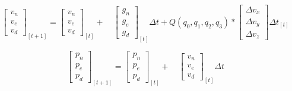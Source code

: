 \begin{equation}
        \left[\begin{array}{c}
            v_n  \\
            v_e  \\
            v_d
        \end{array}\right]_{[t+1]}=\left[\begin{array}{c}
            v_n  \\
            v_e  \\
            v_d
        \end{array}\right]_{[t]}+\quad\left[\begin{array}{c}
            g_n  \\
            g_e  \\
            g_d
        \end{array}\right]_{[t]}{\Delta t}+Q(q_0,q_1,q_2,q_3)*\left[\begin{array}{c}
            \Delta v_x  \\
            \Delta v_y  \\
            \Delta v_z
        \end{array}\right]\Delta t_{[t]}
\end{equation}

\begin{equation}
        \left[\begin{array}{c}
            p_n  \\
            p_e  \\
            p_d
        \end{array}\right]_{[t+1]}=\left[\begin{array}{c}
            p_n  \\
            p_e  \\
            p_d
        \end{array}\right]_{[t]}+\quad\left[\begin{array}{c}
            v_n  \\
            v_e  \\
            v_d
        \end{array}\right]_{[t]}{\Delta t}
\end{equation}

